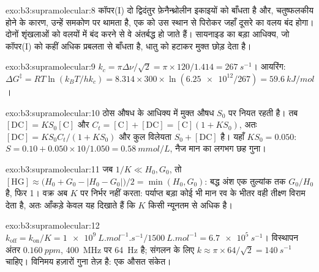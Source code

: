 \begin{solution}{exo:b3:supramolecular:8}
कॉपर(I) दो द्विदंतुर फ़ेनैन्थ्रोलीन इकाइयों को बाँधता है और, चतुष्फलकीय होने के कारण, उन्हें
समकोण पर थामता है, एक को उस स्थान से पिरोकर जहाँ दूसरे का वलय
बंद होगा। दोनों शृंखलाओं को वलयों में बंद करने से वे अंतर्बद्ध हो जाते हैं। सायनाइड का
बड़ा आधिक्य, जो कॉपर(I) को कहीं अधिक प्रबलता से बाँधता है, धातु को हटाकर
मुक्त  छोड़ देता है।
\end{solution}

\begin{solution}{exo:b3:supramolecular:9}
$k_c = \pi\Delta\nu/\sqrt2 = \pi \times 120/1.414 = \qty{267}{s^{-1}}$। आयरिंग:
$\Delta G^\ddagger = RT\ln(k_BT/hk_c) = 8.314 \times 300 \times \ln(\num{6.25e12}/267) = \qty{59.6}{kJ/mol}$।
\end{solution}

\begin{solution}{exo:b3:supramolecular:10}
ठोस औषध के आधिक्य में मुक्त औषध $S_0$ पर नियत रहती है। तब $[\mathrm{DC}] = KS_0[\mathrm C]$ और
$C_t = [\mathrm C] + [\mathrm{DC}] = [\mathrm C](1 + KS_0)$, अतः $[\mathrm{DC}] = KS_0C_t/(1 + KS_0)$ और कुल विलेयता $S_0 + [\mathrm{DC}]$ है। यहाँ
$KS_0 = 0.050$: $S = 0.10 + 0.050 \times 10/1.050 = \qty{0.58}{mmol/L}$, नैज मान का लगभग छह गुना।
\end{solution}

\begin{solution}{exo:b3:supramolecular:11}
जब $1/K \ll H_0, G_0$, तो $[\mathrm{HG}] \approx \bigl(H_0 + G_0 - |H_0 - G_0|\bigr)/2 = \min(H_0, G_0)$: बद्ध अंश एक तुल्यांक तक $G_0/H_0$ है,
फिर 1। वक्र अब $K$ पर निर्भर नहीं करता: पर्याप्त बड़ा कोई भी मान
रव के भीतर वही तीक्ष्ण विराम देता है, अतः आँकड़े केवल यह दिखाते हैं कि $K$
किसी न्यूनतम से अधिक है।
\end{solution}

\begin{solution}{exo:b3:supramolecular:12}
$k_{\mathrm{off}} = k_{\mathrm{on}}/K = \qty{1e9}{L.mol^{-1}.s^{-1}}/\qty{1500}{L.mol^{-1}} = \qty{6.7e5}{s^{-1}}$। विस्थापन अंतर
$\qty{0.160}{ppm}$, \qty{400}{MHz} पर \qty{64}{Hz} है; संगलन के लिए $k \approx \pi \times 64/\sqrt2 = \qty{140}{s^{-1}}$ चाहिए। विनिमय
हज़ारों गुना तेज़ है: एक औसत संकेत।
\end{solution}

